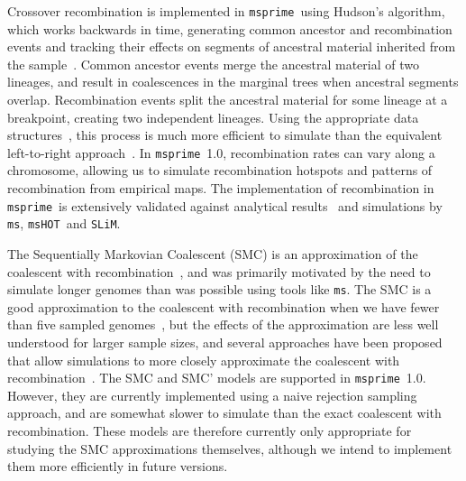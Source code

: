 \documentclass[9pt,twocolumn,twoside,lineno]{gsajnl}
\newcommand{\msprime}[0]{\texttt{msprime}}
\newcommand{\ms}[0]{\texttt{ms}}
\newcommand{\msHOT}[0]{\texttt{msHOT}}
\newcommand{\SLiM}[0]{\texttt{SLiM}}
\begin{document}
Crossover recombination is implemented in \msprime\ using Hudson's algorithm, which
works backwards in time, generating common ancestor and recombination
events and tracking their effects on segments of ancestral
material inherited from the
sample~\citep{hudson1983properties,hudson1990gene,kelleher2016efficient}.
Common ancestor events merge the ancestral material of two lineages,
and result in coalescences in the marginal trees when ancestral
segments overlap.
Recombination events split the ancestral material for some lineage
at a breakpoint, creating two independent
lineages. Using the appropriate data structures~\citep{kelleher2016efficient},
this process is much more efficient to simulate
than the equivalent left-to-right
approach~\citep{wiuf1999recombination,wiuf1999ancestry}.
In \msprime\ 1.0, recombination rates can vary along a chromosome, allowing
us to simulate recombination hotspots and patterns
of recombination from empirical maps.
The implementation of recombination in \msprime\ is extensively validated
against analytical results~\citep{hudson1983properties,kaplan1985use}
and simulations by \ms, \msHOT\ and \SLiM.

The Sequentially Markovian Coalescent (SMC) is an approximation of the
coalescent with recombination~\citep{mcvean2005approximating,marjoram2006fast},
and was primarily motivated by the need to
simulate longer genomes than was possible using tools like \ms.
The SMC is a good approximation to the
coalescent with recombination when we have fewer than five sampled
genomes~\citep{hobolth2014markovian,wilton2015smc}, but the
effects of the approximation are less well understood for larger
sample sizes, and several approaches have been proposed
that allow simulations to more closely approximate the coalescent
with recombination~\citep{chen2009fast,wang2014new,staab2015scrm}.
The SMC and SMC' models are supported
in \msprime\ 1.0. However, they are currently implemented using a
naive rejection sampling approach, and are somewhat slower
to simulate than the exact coalescent with recombination. These
models are therefore currently only appropriate for studying the
SMC approximations themselves, although we intend to
implement them more efficiently in future versions.
\end{document}
